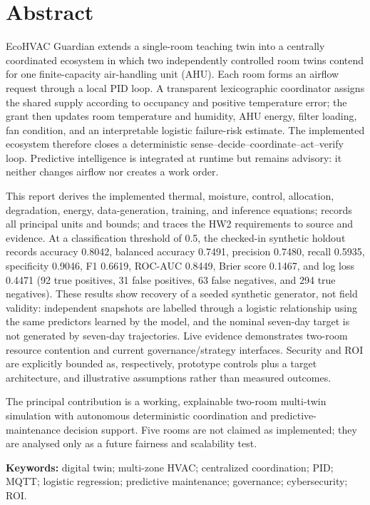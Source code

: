 \chapter*{Abstract}
EcoHVAC Guardian extends a single-room teaching twin into a centrally coordinated ecosystem in which two independently controlled room twins contend for one finite-capacity air-handling unit (AHU). Each room forms an airflow request through a local PID loop. A transparent lexicographic coordinator assigns the shared supply according to occupancy and positive temperature error; the grant then updates room temperature and humidity, AHU energy, filter loading, fan condition, and an interpretable logistic failure-risk estimate. The implemented ecosystem therefore closes a deterministic sense--decide--coordinate--act--verify loop. Predictive intelligence is integrated at runtime but remains advisory: it neither changes airflow nor creates a work order.

This report derives the implemented thermal, moisture, control, allocation, degradation, energy, data-generation, training, and inference equations; records all principal units and bounds; and traces the HW2 requirements to source and evidence. At a classification threshold of 0.5, the checked-in synthetic holdout records accuracy 0.8042, balanced accuracy 0.7491, precision 0.7480, recall 0.5935, specificity 0.9046, F1 0.6619, ROC-AUC 0.8449, Brier score 0.1467, and log loss 0.4471 (92 true positives, 31 false positives, 63 false negatives, and 294 true negatives). These results show recovery of a seeded synthetic generator, not field validity: independent snapshots are labelled through a logistic relationship using the same predictors learned by the model, and the nominal seven-day target is not generated by seven-day trajectories. Live evidence demonstrates two-room resource contention and current governance/strategy interfaces. Security and ROI are explicitly bounded as, respectively, prototype controls plus a target architecture, and illustrative assumptions rather than measured outcomes.

The principal contribution is a working, explainable two-room multi-twin simulation with autonomous deterministic coordination and predictive-maintenance decision support. Five rooms are not claimed as implemented; they are analysed only as a future fairness and scalability test.

\vspace{3mm}
\noindent\textbf{Keywords:} digital twin; multi-zone HVAC; centralized coordination; PID; MQTT; logistic regression; predictive maintenance; governance; cybersecurity; ROI.


